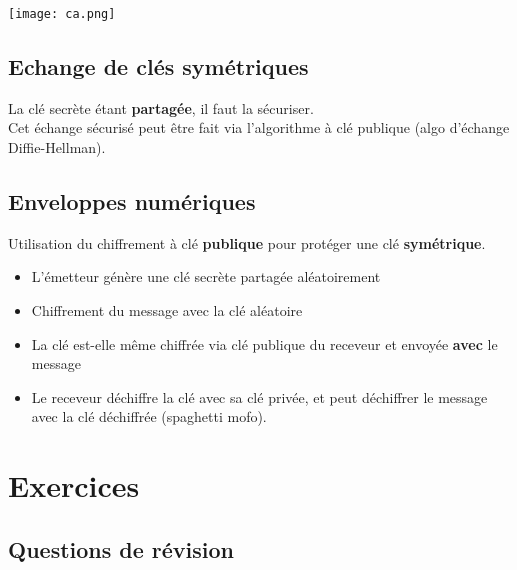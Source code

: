 \documentclass{report}
\begin{document}
			\texttt{[image: ca.png]}

		\subsection{Echange de clés symétriques}

			La clé secrète étant \textbf{partagée}, il faut la sécuriser.\\
			Cet échange sécurisé peut être fait via l'algorithme à clé publique (algo d'échange Diffie-Hellman).\\

		\subsection{Enveloppes numériques}

			Utilisation du chiffrement à clé \textbf{publique} pour protéger une clé \textbf{symétrique}.\\

			\begin{itemize}
				\item L'émetteur génère une clé secrète partagée aléatoirement
				\item Chiffrement du message avec la clé aléatoire
				\item La clé est-elle même chiffrée via clé publique du receveur et envoyée \textbf{avec} le message
				\item Le receveur déchiffre la clé avec sa clé privée, et peut déchiffrer le message avec la clé déchiffrée (spaghetti mofo).\\
			\end{itemize}
	
	\section{Exercices}

		\subsection{Questions de révision}
\end{document}
